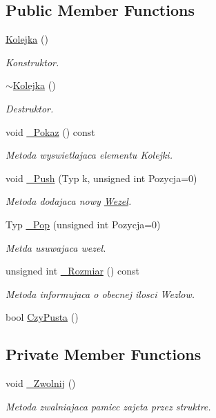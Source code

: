 \subsection*{Public Member Functions}
\begin{DoxyCompactItemize}
\item 
\hyperlink{class_kolejka_a832240e4b63012eaa75f915986fdbb40}{Kolejka} ()
\begin{DoxyCompactList}\small\item\em Konstruktor. \end{DoxyCompactList}\item 
\hyperlink{class_kolejka_a4fe07cc3d71f815492010dc9bb665c7a}{$\sim$\-Kolejka} ()
\begin{DoxyCompactList}\small\item\em Destruktor. \end{DoxyCompactList}\item 
void \hyperlink{class_kolejka_a47121a1d8dd1b45bcf5411ab2d5bc099}{\-\_\-\-Pokaz} () const 
\begin{DoxyCompactList}\small\item\em Metoda wyswietlajaca elementu Kolejki. \end{DoxyCompactList}\item 
void \hyperlink{class_kolejka_a215bd2ca4b5db7ec861dfc78ee072858}{\-\_\-\-Push} (Typ k, unsigned int Pozycja=0)
\begin{DoxyCompactList}\small\item\em Metoda dodajaca nowy \hyperlink{struct_kolejka_1_1_wezel}{Wezel}. \end{DoxyCompactList}\item 
Typ \hyperlink{class_kolejka_ab26939041331d337b398819e3cc4443f}{\-\_\-\-Pop} (unsigned int Pozycja=0)
\begin{DoxyCompactList}\small\item\em Metda usuwajaca wezel. \end{DoxyCompactList}\item 
unsigned int \hyperlink{class_kolejka_ae76fad7ebe4fbc2bb7900e129a3677bc}{\-\_\-\-Rozmiar} () const 
\begin{DoxyCompactList}\small\item\em Metoda informujaca o obecnej ilosci Wezlow. \end{DoxyCompactList}\item 
bool \hyperlink{class_kolejka_aaeff23686afd067382547a9b37cb0187}{Czy\-Pusta} ()
\end{DoxyCompactItemize}
\subsection*{Private Member Functions}
\begin{DoxyCompactItemize}
\item 
void \hyperlink{class_kolejka_a607af93211b5e5e31123c633e1f1fcf2}{\-\_\-\-Zwolnij} ()
\begin{DoxyCompactList}\small\item\em Metoda zwalniajaca pamiec zajeta przez struktre. \end{DoxyCompactList}\end{DoxyCompactItemize}
